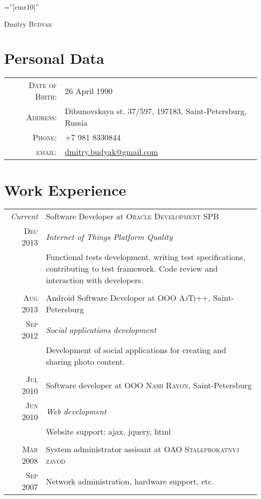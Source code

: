 \documentclass[a4paper,10pt]{article}
\begin{document}
\pagestyle{empty}
\font\fb=''[cmr10]''
\par{\centering
	{\Huge Dmitry \textsc{Budyak}
	}\bigskip\par}

\section{Personal Data}
	\begin{tabular}{rl}
	\textsc{Date of Birth:} &  26 April 1990 \\
      	\textsc{Address:}   & Dibunovskaya st. 37/597, 197183, Saint-Petersburg, Russia \\
	\textsc{Phone:}     & +7 981 8330844 \\
	\textsc{email:}     & \href{mailto:dmitry.budyak@gmail.com}{dmitry.budyak@gmail.com}
	\end{tabular}

\section{Work Experience}
	\begin{tabular}{r|p{11cm}}
	  \emph{Current} & Software Developer at 
	  \textsc{Oracle Development SPB} \\
	  \textsc{Dec 2013}&\emph{Internet of Things Platform Quality}\\&\footnotesize{Functional tests development, writing test specifications, contributing to test framework. Code review and interaction with developers.}\\
	    \multicolumn{2}{c}{} \\
		\textsc{Aug 2013} & Android Software Developer at 
		\textsc{OOO AjTi++}, Saint-Petersburg \\
		\textsc{Sep 2012}&\emph{Social applications development}\\&\footnotesize{Development of social applications for creating and sharing photo content.}\\
		  \multicolumn{2}{c}{} \\
		\textsc{Jul 2010} & Software developer at 
		\textsc{OOO Nash Rayon}, Saint-Petersburg \\
		\textsc{Jun 2010}&\emph{Web development}\\&\footnotesize{Website support: ajax, jquery, html}\\
		  \multicolumn{2}{c}{} \\
		\textsc{Mar 2008} & System administrator assisant at 
		\textsc{OAO Staleprokatnyj zavod}\\
		\textsc{Sep 2007}&\footnotesize{Network administration, hardware support, etc.}
		\end{tabular}
\end{document}
